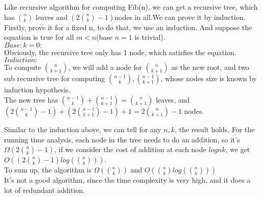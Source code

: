 \documentclass[UTF8]{ctexart}
\begin{document}
Like recursive algorithm for computing Fib(n), we can get a recursive tree, 
which has $ \binom n k$ leaves and $ (2 \binom n k - 1) $nodes in all.We can prove it by induction.
\\
\hspace*{1em} Firstly, prove it for a fixed n, to do that, we use an induction. 
And suppose the equation is true for all $m < n$(base $n = 1$ is trivial).\\
$Base: k = 0:$\\
\hspace*{1em} Obviously, the recursive tree only has 1 node, which satisfies the equation.\\
$Induction:$\\
\hspace*{1em} To compute $\binom n {k+1} $, we will add a node for $\binom n {k+1}$ as the new root,
and two sub recursive tree for computing $\binom {n - 1} {k}, \binom {n - 1}{k + 1}$, 
whose nodes size is known by induction hypothesis.\\
\hspace*{1em} The new tree has $\binom {n-1} {k} + \binom{n - 1} {k + 1} = \binom{n}{k + 1}$ leaves,
and $(2\binom{n - 1}{k} - 1)+ (2\binom{n - 1}{k + 1} -1) + 1= 2\binom n {k + 1} - 1 $ nodes.

Similar to the induction above, we can tell for any $n, k$, the result holds.
For the running time analysis, each node in the tree needs to do an addition,
so it's $\Omega (2 \binom n k - 1)$, if we consider the cost of addition at each node $log {n}{k}$, we get
$O((2 \binom n k - 1)log(\binom n k))$.\\
\hspace*{1em} To sum up, the algorithm is $\Omega(\binom n k)$ and $O(\binom n k log(\binom n k))$\\
\hspace*{1em} It's not a good algorithm, since the time complexity is very high, and it does a lot of 
redundant addition.

\newpage
\end{document}
